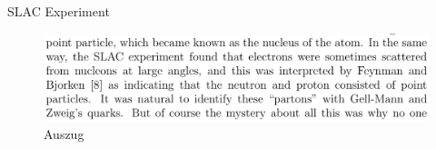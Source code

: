 \documentclass[t,9pt]{beamer}
\begin{document}
        \begin{frame}{SLAC Experiment}
                \begin{figure}
                        \includegraphics[width=\textwidth]{prosi_making_of_standard_model_identify_partons_quarks.png}
                        \caption*{Auszug \cite{Weinberg2004}} \end{figure}
        \end{frame}\fi %
                
\end{document}
